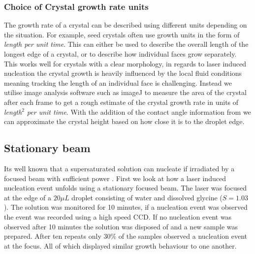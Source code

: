 \subsubsection{Choice of Crystal growth rate units}
The growth rate of a crystal can be described using different
units depending on the situation. For example, seed crystals 
often use growth units in the form of \textit{length per unit
time}. This can either be used to describe the overall length
of the longest edge of a crystal, or to describe how individual
faces grow separately. This works well for crystals with a 
clear morphology, in regards to laser induced nucleation the 
crystal growth is heavily influenced by the local fluid 
conditions meaning tracking the length of an individual face 
is challenging. Instead we utilise image analysis software 
such as imageJ to measure the area of the crystal after each 
frame to get a rough estimate of the crystal growth rate in 
units of \textit{length$^2$ per unit time}. With the addition 
of the contact angle information from \cite{Flannigan2023} we 
can approximate the crystal height based on how close it is to 
the droplet edge.

\subsection{Stationary beam}
\label{sec:stationary}
Its well known that a supersaturated solution can nucleate
if irradiated by a focused beam with sufficient power 
\cite{Rungsimanon2010}. First we look at how a laser induced
nucleation event unfolds using a stationary focused beam. 
The laser was focused at the edge of a $20\mu L$ droplet 
consisting of water and dissolved glycine ($S=1.03$). The 
solution was monitored for 10 minutes, if a nucleation event 
was observed the event was recorded using a high speed CCD. 
If no nucleation event was observed after 10 minutes the 
solution was disposed of and a new sample was prepared. After 
ten repeats only 30\% of the samples observed a nucleation 
event at the focus. All of which displayed similar growth 
behaviour to one another.

